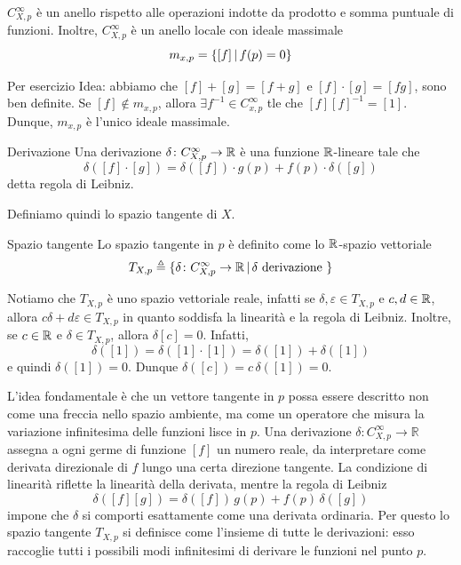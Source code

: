 \documentclass[a4paper]{article}
\begin{document}
\begin{snippetproposition}{}
    \(C^\infty_{X,p}\) è un anello rispetto alle operazioni indotte da prodotto e somma puntuale
    di funzioni.
    Inoltre, \(C^\infty_{X,p}\) è un anello locale
    con ideale massimale \[
        m_{x,p} = \{
            [f] \,|\, f(p) = 0
        \}
    \]
\end{snippetproposition}

\begin{snippetproof}{Per esercizio}
    Idea:
    abbiamo che \([f] + [g] = [f+g]\)
    e \([f] \cdot [g] = [fg]\),
    sono ben definite.
    Se \([f] \notin m_{x,p}\), allora
    \(\exists f^{-1} \in C^\infty_{x,p}\)
    tle che \([f][f]^{-1} = [1]\).
    Dunque, \(m_{x,p}\) è l'unico ideale massimale.
\end{snippetproof}

\begin{snippetdefinition}{Derivazione}
    Una derivazione \(\delta \colon C^\infty_{X,p} \to \mathbb{R}\)
    è una funzione \(\mathbb{R}\)-lineare tale che
    \[
        \delta([f]\cdot [g]) = \delta([f]) \cdot g(p) + f(p) \cdot \delta([g])
    \]
    detta regola di Leibniz.
\end{snippetdefinition}

Definiamo quindi lo spazio tangente di \(X\).

\begin{snippetdefinition}{Spazio tangente}
    Lo spazio tangente in \(p\) è definito come lo \(\mathbb{R}\)-spazio vettoriale
    \[
        T_{X, p} \triangleq \{
            \delta \colon C^\infty_{X,p} \to \mathbb{R}
            \,|\, \delta \text{ derivazione }    
        \}
    \]
\end{snippetdefinition}

Notiamo che \(T_{X,p}\) è uno spazio vettoriale reale, infatti se \(\delta, \varepsilon \in T_{X,p}\)
e \(c,d \in \mathbb{R}\), allora \(c \delta + d \varepsilon \in T_{X, p}\)
in quanto soddisfa la linearità e la regola di Leibniz.
Inoltre, se \(c \in \mathbb{R}\)
e \(\delta \in T_{X,p}\),
allora \(\delta[c] = 0\).
Infatti, \[
    \delta([1]) = \delta([1]\cdot[1])
    = \delta([1])+\delta([1])
\]
e quindi \(\delta([1])=0\). Dunque \(\delta([c])=c\,\delta([1])=0\).

L'idea fondamentale è che un vettore tangente in \(p\) possa essere descritto
non come una freccia nello spazio ambiente, ma come un operatore che misura
la variazione infinitesima delle funzioni lisce in \(p\). Una derivazione
\(\delta \colon C^\infty_{X,p}\to\mathbb{R}\) assegna a ogni germe di funzione
\([f]\) un numero reale, da interpretare come derivata direzionale di \(f\)
lungo una certa direzione tangente. La condizione di linearità riflette la
linearità della derivata, mentre la regola di Leibniz
\[
    \delta([f][g])=\delta([f])\,g(p)+f(p)\,\delta([g])
\]
impone che \(\delta\) si comporti esattamente come una derivata ordinaria.
Per questo lo spazio tangente \(T_{X,p}\) si definisce come l'insieme di tutte
le derivazioni: esso raccoglie tutti i possibili modi infinitesimi di derivare
le funzioni nel punto \(p\).
\end{document}
